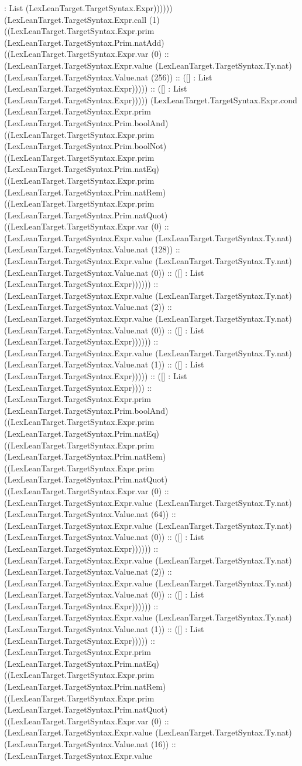\documentclass[11pt]{article}
\begin{document}
: List (LexLeanTarget.TargetSyntax.Expr)))))) (LexLeanTarget.TargetSyntax.Expr.call (1) ((LexLeanTarget.TargetSyntax.Expr.prim (LexLeanTarget.TargetSyntax.Prim.natAdd) ((LexLeanTarget.TargetSyntax.Expr.var (0) :: (LexLeanTarget.TargetSyntax.Expr.value (LexLeanTarget.TargetSyntax.Ty.nat) (LexLeanTarget.TargetSyntax.Value.nat (256)) :: ([] : List (LexLeanTarget.TargetSyntax.Expr))))) :: ([] : List (LexLeanTarget.TargetSyntax.Expr))))) (LexLeanTarget.TargetSyntax.Expr.cond (LexLeanTarget.TargetSyntax.Expr.prim (LexLeanTarget.TargetSyntax.Prim.boolAnd) ((LexLeanTarget.TargetSyntax.Expr.prim (LexLeanTarget.TargetSyntax.Prim.boolNot) ((LexLeanTarget.TargetSyntax.Expr.prim (LexLeanTarget.TargetSyntax.Prim.natEq) ((LexLeanTarget.TargetSyntax.Expr.prim (LexLeanTarget.TargetSyntax.Prim.natRem) ((LexLeanTarget.TargetSyntax.Expr.prim (LexLeanTarget.TargetSyntax.Prim.natQuot) ((LexLeanTarget.TargetSyntax.Expr.var (0) :: (LexLeanTarget.TargetSyntax.Expr.value (LexLeanTarget.TargetSyntax.Ty.nat) (LexLeanTarget.TargetSyntax.Value.nat (128)) :: (LexLeanTarget.TargetSyntax.Expr.value (LexLeanTarget.TargetSyntax.Ty.nat) (LexLeanTarget.TargetSyntax.Value.nat (0)) :: ([] : List (LexLeanTarget.TargetSyntax.Expr)))))) :: (LexLeanTarget.TargetSyntax.Expr.value (LexLeanTarget.TargetSyntax.Ty.nat) (LexLeanTarget.TargetSyntax.Value.nat (2)) :: (LexLeanTarget.TargetSyntax.Expr.value (LexLeanTarget.TargetSyntax.Ty.nat) (LexLeanTarget.TargetSyntax.Value.nat (0)) :: ([] : List (LexLeanTarget.TargetSyntax.Expr)))))) :: (LexLeanTarget.TargetSyntax.Expr.value (LexLeanTarget.TargetSyntax.Ty.nat) (LexLeanTarget.TargetSyntax.Value.nat (1)) :: ([] : List (LexLeanTarget.TargetSyntax.Expr))))) :: ([] : List (LexLeanTarget.TargetSyntax.Expr)))) :: (LexLeanTarget.TargetSyntax.Expr.prim (LexLeanTarget.TargetSyntax.Prim.boolAnd) ((LexLeanTarget.TargetSyntax.Expr.prim (LexLeanTarget.TargetSyntax.Prim.natEq) ((LexLeanTarget.TargetSyntax.Expr.prim (LexLeanTarget.TargetSyntax.Prim.natRem) ((LexLeanTarget.TargetSyntax.Expr.prim (LexLeanTarget.TargetSyntax.Prim.natQuot) ((LexLeanTarget.TargetSyntax.Expr.var (0) :: (LexLeanTarget.TargetSyntax.Expr.value (LexLeanTarget.TargetSyntax.Ty.nat) (LexLeanTarget.TargetSyntax.Value.nat (64)) :: (LexLeanTarget.TargetSyntax.Expr.value (LexLeanTarget.TargetSyntax.Ty.nat) (LexLeanTarget.TargetSyntax.Value.nat (0)) :: ([] : List (LexLeanTarget.TargetSyntax.Expr)))))) :: (LexLeanTarget.TargetSyntax.Expr.value (LexLeanTarget.TargetSyntax.Ty.nat) (LexLeanTarget.TargetSyntax.Value.nat (2)) :: (LexLeanTarget.TargetSyntax.Expr.value (LexLeanTarget.TargetSyntax.Ty.nat) (LexLeanTarget.TargetSyntax.Value.nat (0)) :: ([] : List (LexLeanTarget.TargetSyntax.Expr)))))) :: (LexLeanTarget.TargetSyntax.Expr.value (LexLeanTarget.TargetSyntax.Ty.nat) (LexLeanTarget.TargetSyntax.Value.nat (1)) :: ([] : List (LexLeanTarget.TargetSyntax.Expr))))) :: (LexLeanTarget.TargetSyntax.Expr.prim (LexLeanTarget.TargetSyntax.Prim.natEq) ((LexLeanTarget.TargetSyntax.Expr.prim (LexLeanTarget.TargetSyntax.Prim.natRem) ((LexLeanTarget.TargetSyntax.Expr.prim (LexLeanTarget.TargetSyntax.Prim.natQuot) ((LexLeanTarget.TargetSyntax.Expr.var (0) :: (LexLeanTarget.TargetSyntax.Expr.value (LexLeanTarget.TargetSyntax.Ty.nat) (LexLeanTarget.TargetSyntax.Value.nat (16)) :: (LexLeanTarget.TargetSyntax.Expr.value 
\end{document}
